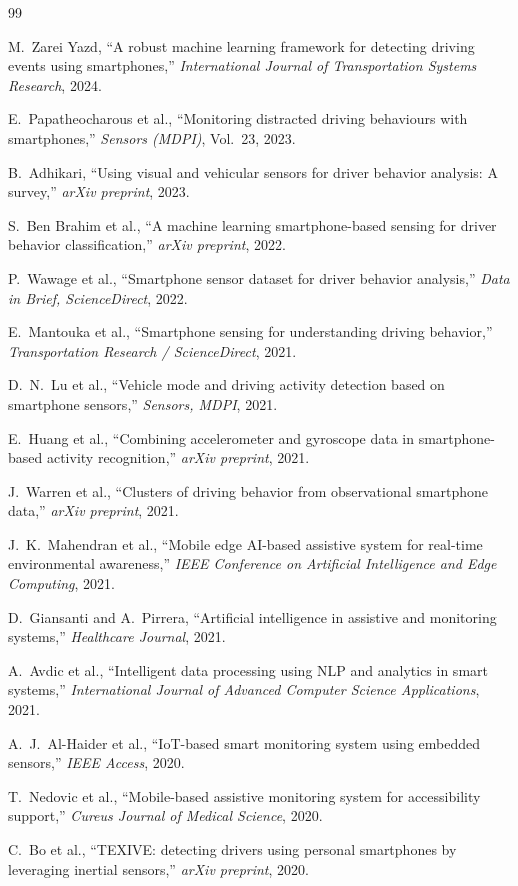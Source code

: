 \begin{thebibliography}{99}

M.~Zarei Yazd, ``A robust machine learning framework for detecting driving events using smartphones,'' \emph{International Journal of Transportation Systems Research}, 2024.

E.~Papatheocharous et al., ``Monitoring distracted driving behaviours with smartphones,'' \emph{Sensors (MDPI)}, Vol.~23, 2023.

B.~Adhikari, ``Using visual and vehicular sensors for driver behavior analysis: A survey,'' \emph{arXiv preprint}, 2023.

S.~Ben Brahim et al., ``A machine learning smartphone-based sensing for driver behavior classification,'' \emph{arXiv preprint}, 2022.

P.~Wawage et al., ``Smartphone sensor dataset for driver behavior analysis,'' \emph{Data in Brief, ScienceDirect}, 2022.

E.~Mantouka et al., ``Smartphone sensing for understanding driving behavior,'' \emph{Transportation Research / ScienceDirect}, 2021.

D.~N.~Lu et al., ``Vehicle mode and driving activity detection based on smartphone sensors,'' \emph{Sensors, MDPI}, 2021.

E.~Huang et al., ``Combining accelerometer and gyroscope data in smartphone-based activity recognition,'' \emph{arXiv preprint}, 2021.

J.~Warren et al., ``Clusters of driving behavior from observational smartphone data,'' \emph{arXiv preprint}, 2021.

J.~K.~Mahendran et al., ``Mobile edge AI-based assistive system for real-time environmental awareness,'' \emph{IEEE Conference on Artificial Intelligence and Edge Computing}, 2021.

D.~Giansanti and A.~Pirrera, ``Artificial intelligence in assistive and monitoring systems,'' \emph{Healthcare Journal}, 2021.

A.~Avdic et al., ``Intelligent data processing using NLP and analytics in smart systems,'' \emph{International Journal of Advanced Computer Science Applications}, 2021.

A.~J.~Al-Haider et al., ``IoT-based smart monitoring system using embedded sensors,'' \emph{IEEE Access}, 2020.

T.~Nedovic et al., ``Mobile-based assistive monitoring system for accessibility support,'' \emph{Cureus Journal of Medical Science}, 2020.

C.~Bo et al., ``TEXIVE: detecting drivers using personal smartphones by leveraging inertial sensors,'' \emph{arXiv preprint}, 2020.

\end{thebibliography}
